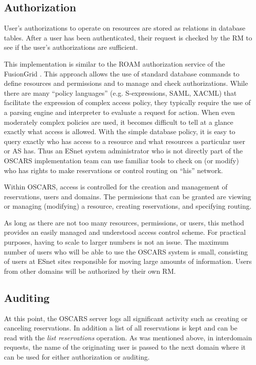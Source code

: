 \documentclass[conference]{IEEEtran}
\begin{document}
\subsection{Authorization}
User's authorizations to operate on resources are stored as relations
in database tables.  After a user has been authenticated, their request
is checked by the RM to see if the user's authorizations are sufficient.

This implementation is similar to the ROAM authorization service of the
FusionGrid \cite{burruss}.  This approach allows the use of standard database
commands to define resources and permissions and to manage and check
authorizations.
While there are many ``policy languages'' (e.g. S-expressions,
SAML, XACML) that facilitate the expression of complex access policy, they
typically require the use of a parsing engine and interpreter to evaluate a 
request for action. When even moderately complex policies are used, it
becomes difficult to tell at a glance exactly what access is allowed. With the 
simple database policy, it is easy to query exactly who has access to a 
resource and what resources a particular user or AS  has. Thus an ESnet system 
administrator who is
not directly part of the OSCARS implementation team can use familiar tools to 
check on (or modify)
who has rights to make reservations or control routing on ``his'' network. 

Within OSCARS, access is controlled for the creation and management of 
reservations, users and domains. The permissions that can
be granted are viewing or managing (modifying) a resource, creating
reservations, and specifying routing.

As long as there are not too many resources, permissions, or users, this
method provides an easily managed and understood access control scheme.
For practical purposes, having to scale to larger numbers is not an
issue.  The maximum number of users who will be able to use the OSCARS
system is small, consisting of users at ESnet sites responsible for moving
large amounts of information.  Users from other domains will be authorized by
their own RM.

\subsection{Auditing}
At this point, the OSCARS server logs all significant activity such as
creating or canceling reservations. In addition a list of all
reservations is kept and can be read with the \emph{list reservations}
operation. As was mentioned above, in interdomain requests, the name
of the originating user is passed to the next domain where it can be
used for either authorization or auditing.
\end{document}
